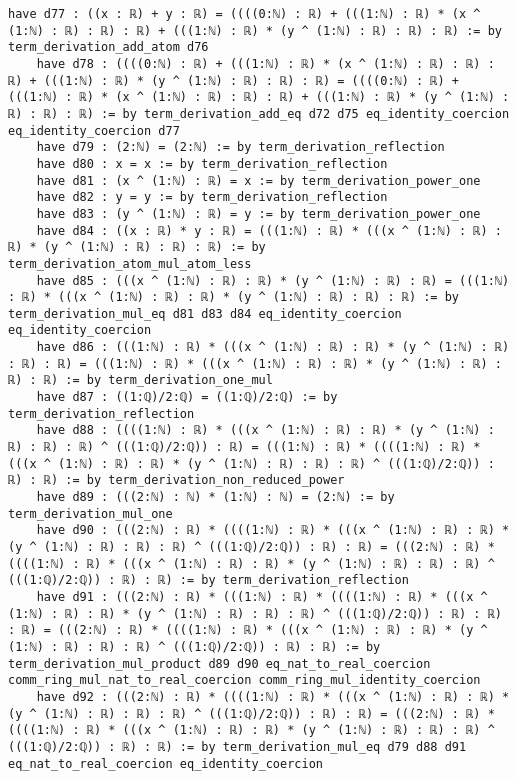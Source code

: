 \documentclass{article}
\begin{document}
\begin{tcolorbox}[colback=white!10, width=\linewidth]
\begin{lstlisting}[language=Lean4]
    have d77 : ((x : ℝ) + y : ℝ) = ((((0:ℕ) : ℝ) + (((1:ℕ) : ℝ) * (x ^ (1:ℕ) : ℝ) : ℝ) : ℝ) + (((1:ℕ) : ℝ) * (y ^ (1:ℕ) : ℝ) : ℝ) : ℝ) := by term_derivation_add_atom d76
    have d78 : ((((0:ℕ) : ℝ) + (((1:ℕ) : ℝ) * (x ^ (1:ℕ) : ℝ) : ℝ) : ℝ) + (((1:ℕ) : ℝ) * (y ^ (1:ℕ) : ℝ) : ℝ) : ℝ) = ((((0:ℕ) : ℝ) + (((1:ℕ) : ℝ) * (x ^ (1:ℕ) : ℝ) : ℝ) : ℝ) + (((1:ℕ) : ℝ) * (y ^ (1:ℕ) : ℝ) : ℝ) : ℝ) := by term_derivation_add_eq d72 d75 eq_identity_coercion eq_identity_coercion d77
    have d79 : (2:ℕ) = (2:ℕ) := by term_derivation_reflection
    have d80 : x = x := by term_derivation_reflection
    have d81 : (x ^ (1:ℕ) : ℝ) = x := by term_derivation_power_one
    have d82 : y = y := by term_derivation_reflection
    have d83 : (y ^ (1:ℕ) : ℝ) = y := by term_derivation_power_one
    have d84 : ((x : ℝ) * y : ℝ) = (((1:ℕ) : ℝ) * (((x ^ (1:ℕ) : ℝ) : ℝ) * (y ^ (1:ℕ) : ℝ) : ℝ) : ℝ) := by term_derivation_atom_mul_atom_less
    have d85 : (((x ^ (1:ℕ) : ℝ) : ℝ) * (y ^ (1:ℕ) : ℝ) : ℝ) = (((1:ℕ) : ℝ) * (((x ^ (1:ℕ) : ℝ) : ℝ) * (y ^ (1:ℕ) : ℝ) : ℝ) : ℝ) := by term_derivation_mul_eq d81 d83 d84 eq_identity_coercion eq_identity_coercion
    have d86 : (((1:ℕ) : ℝ) * (((x ^ (1:ℕ) : ℝ) : ℝ) * (y ^ (1:ℕ) : ℝ) : ℝ) : ℝ) = (((1:ℕ) : ℝ) * (((x ^ (1:ℕ) : ℝ) : ℝ) * (y ^ (1:ℕ) : ℝ) : ℝ) : ℝ) := by term_derivation_one_mul
    have d87 : ((1:ℚ)/2:ℚ) = ((1:ℚ)/2:ℚ) := by term_derivation_reflection
    have d88 : ((((1:ℕ) : ℝ) * (((x ^ (1:ℕ) : ℝ) : ℝ) * (y ^ (1:ℕ) : ℝ) : ℝ) : ℝ) ^ (((1:ℚ)/2:ℚ)) : ℝ) = (((1:ℕ) : ℝ) * ((((1:ℕ) : ℝ) * (((x ^ (1:ℕ) : ℝ) : ℝ) * (y ^ (1:ℕ) : ℝ) : ℝ) : ℝ) ^ (((1:ℚ)/2:ℚ)) : ℝ) : ℝ) := by term_derivation_non_reduced_power
    have d89 : (((2:ℕ) : ℕ) * (1:ℕ) : ℕ) = (2:ℕ) := by term_derivation_mul_one
    have d90 : (((2:ℕ) : ℝ) * ((((1:ℕ) : ℝ) * (((x ^ (1:ℕ) : ℝ) : ℝ) * (y ^ (1:ℕ) : ℝ) : ℝ) : ℝ) ^ (((1:ℚ)/2:ℚ)) : ℝ) : ℝ) = (((2:ℕ) : ℝ) * ((((1:ℕ) : ℝ) * (((x ^ (1:ℕ) : ℝ) : ℝ) * (y ^ (1:ℕ) : ℝ) : ℝ) : ℝ) ^ (((1:ℚ)/2:ℚ)) : ℝ) : ℝ) := by term_derivation_reflection
    have d91 : (((2:ℕ) : ℝ) * (((1:ℕ) : ℝ) * ((((1:ℕ) : ℝ) * (((x ^ (1:ℕ) : ℝ) : ℝ) * (y ^ (1:ℕ) : ℝ) : ℝ) : ℝ) ^ (((1:ℚ)/2:ℚ)) : ℝ) : ℝ) : ℝ) = (((2:ℕ) : ℝ) * ((((1:ℕ) : ℝ) * (((x ^ (1:ℕ) : ℝ) : ℝ) * (y ^ (1:ℕ) : ℝ) : ℝ) : ℝ) ^ (((1:ℚ)/2:ℚ)) : ℝ) : ℝ) := by term_derivation_mul_product d89 d90 eq_nat_to_real_coercion comm_ring_mul_nat_to_real_coercion comm_ring_mul_identity_coercion
    have d92 : (((2:ℕ) : ℝ) * ((((1:ℕ) : ℝ) * (((x ^ (1:ℕ) : ℝ) : ℝ) * (y ^ (1:ℕ) : ℝ) : ℝ) : ℝ) ^ (((1:ℚ)/2:ℚ)) : ℝ) : ℝ) = (((2:ℕ) : ℝ) * ((((1:ℕ) : ℝ) * (((x ^ (1:ℕ) : ℝ) : ℝ) * (y ^ (1:ℕ) : ℝ) : ℝ) : ℝ) ^ (((1:ℚ)/2:ℚ)) : ℝ) : ℝ) := by term_derivation_mul_eq d79 d88 d91 eq_nat_to_real_coercion eq_identity_coercion

\end{lstlisting}
\end{tcolorbox}
\end{document}
